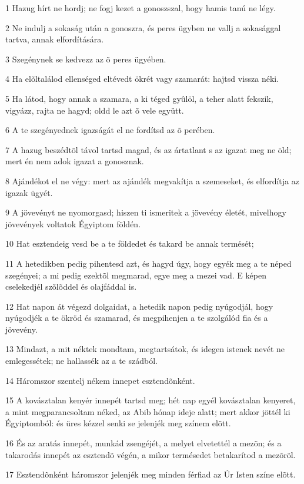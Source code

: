 \par 1 Hazug hírt ne hordj; ne fogj kezet a gonoszszal, hogy hamis tanú ne légy.
\par 2 Ne indulj a sokaság után a gonoszra, és peres ügyben ne vallj a sokasággal tartva, annak elfordítására.
\par 3 Szegénynek se kedvezz az õ peres ügyében.
\par 4 Ha elõltalálod ellenséged eltévedt ökrét vagy szamarát: hajtsd vissza néki.
\par 5 Ha látod, hogy annak a szamara, a ki téged gyûlöl, a teher alatt fekszik, vigyázz, rajta ne hagyd; oldd le azt õ vele együtt.
\par 6 A te szegényednek igazságát el ne fordítsd az õ perében.
\par 7 A hazug beszédtõl távol tartsd magad, és az ártatlant s az igazat meg ne öld; mert én nem adok igazat a gonosznak.
\par 8 Ajándékot el ne végy: mert az ajándék megvakítja a szemeseket, és elfordítja az igazak ügyét.
\par 9 A jövevényt ne nyomorgasd; hiszen ti ismeritek a jövevény  életét, mivelhogy jövevények voltatok Égyiptom földén.
\par 10 Hat esztendeig vesd be a te földedet és takard be annak termését;
\par 11 A hetedikben pedig pihentesd azt, és hagyd úgy, hogy egyék meg a te néped szegényei; a mi pedig ezektõl megmarad, egye meg a mezei vad. E képen cselekedjél szõlõddel és olajfáddal is.
\par 12 Hat napon át végezd dolgaidat, a hetedik napon pedig nyúgodjál, hogy nyúgodjék a te ökröd és szamarad, és megpihenjen  a te szolgálód fia és a jövevény.
\par 13 Mindazt, a mit néktek mondtam, megtartsátok, és idegen istenek nevét ne emlegessétek; ne hallassék az a te szádból.
\par 14 Háromszor szentelj nékem innepet esztendõnként.
\par 15 A kovásztalan kenyér innepét tartsd meg; hét nap egyél kovásztalan kenyeret, a mint megparancsoltam néked, az Abib hónap ideje alatt; mert akkor jöttél ki Égyiptomból: és  üres kézzel senki se jelenjék meg színem elõtt.
\par 16 És az aratás innepét, munkád zsengéjét, a melyet elvetettél a mezõn; és a takarodás innepét az esztendõ végén, a mikor termésedet betakarítod a mezõrõl.
\par 17 Esztendõnként háromszor jelenjék meg minden férfiad az Úr Isten színe elõtt.
